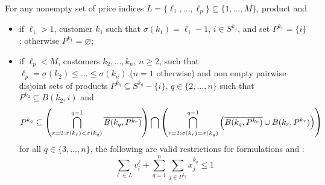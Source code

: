 \begin{theorem}
    \label{thm:vineqs}

    For any nonempty set of price indices
    $
        L =         \{\ell_1, \ldots, \ell_p\}
          \subseteq \{1,      \ldots, M     \}
    $,
    product \ii and
    \begin{itemize}
        \item %
	    if $\ell_1 > 1$, customer $k_1$ such that $\sigma(k_1) = \ell_1 -
	    1$, $i \in S^{k_1}$, and set $P^{k_1} = \{i\}$; otherwise $P^{k_1} =
	    \varnothing$;
	\item %
	    if $\ell_p < M$, customers $k_2, \ldots, k_n$, $n \geq 2$, such that
	    $
	        \ell_p = \sigma(k_2) \leq \ldots \leq \sigma(k_n)
	    $
	    ($n = 1$ otherwise) and non empty pairwise disjoint sets of products
	    $P^{k_q} \subseteq S^{k_q} - \{i\}$, $q \in \{2, \ldots, n\}$ such
	    that $P^{k_2} \subseteq \overline{B(k_2, i)}$ and
            \begin{equation*}
                P^{k_q} \subseteq
                        \left(
                            \bigcap_{r=2:\\ \sigma(k_r) < \sigma(k_q)}^{q-1}
                                \overline{B(k_q, P^{k_r})}
                        \right)
                    \bigcap
                        \left(
                            \bigcap_{r=2:\\ \sigma(k_r) = \sigma(k_q)}^{q-1}
                                \left(
                                        \overline{B(k_q, P^{k_r})}
                                    \cup
                                        B(k_r, P^{k_r})
                                \right)
                        \right)
            \end{equation*}
	    for all $q \in \{3, \ldots, n\}$, the following are valid
	    restrictions for formulations \slla and \sllb:
	    \begin{equation}
    	        \label{eqn:vineqs}
    	            \sum_{\ell \in L} v_i^\ell
    	        +
    	            \sum_{q=1}^n \sum_{j \in P^{k_q}} x_j^{k_q}
    	        \leq
    	            1
	    \end{equation}
    \end{itemize}
    

\end{theorem}
